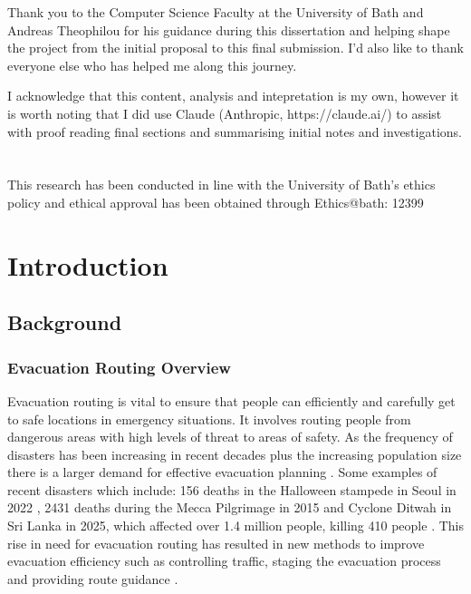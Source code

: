 \documentclass[12pt,a4paper]{report}
\begin{document}
Thank you to the Computer Science Faculty at the University of Bath and Andreas Theophilou for his guidance during this dissertation and helping shape the project from the initial proposal to this final submission. I'd also like to thank everyone else who has helped me along this journey.

I acknowledge that this content, analysis and intepretation is my own, however it is worth noting that I did use Claude (Anthropic, https://claude.ai/) to assist with proof reading final sections and summarising initial notes and investigations.

\newpage

\chapter*{}
This research has been conducted in line with the University of Bath’s ethics policy and ethical approval has been obtained through Ethics@bath: 12399

\newpage
\setcounter{page}{1}
\chapter{Introduction}

\section{Background}

\subsection{Evacuation Routing Overview}
Evacuation routing is vital to ensure that people can efficiently and carefully get to safe locations in emergency situations. It involves routing people from dangerous areas with high levels of threat to areas of safety. As the frequency of disasters has been increasing in recent decades \citep{ALDAHLAWI_2024,RITCHIE_2024} plus the increasing population size \citep{ALSNIH_2004} there is a larger demand for effective evacuation planning \citep{CHEN_C_2023,KAMYABNIYA_2024}. Some examples of recent disasters which include: 156 deaths in the Halloween stampede in Seoul in 2022 \citep{SON_HALLOWEEN_2025}, 2431 deaths during the Mecca Pilgrimage in 2015 \citep{GANJEH_MECCA_2016} and Cyclone Ditwah in Sri Lanka in 2025, which affected over 1.4 million people, killing 410 people \citep{WHO_CYCLONE_2026}. This rise in need for evacuation routing has resulted in new methods to improve evacuation efficiency such as controlling traffic, staging the evacuation process and providing route guidance \citep{ABBELGAWAD_2009}.
\end{document}
